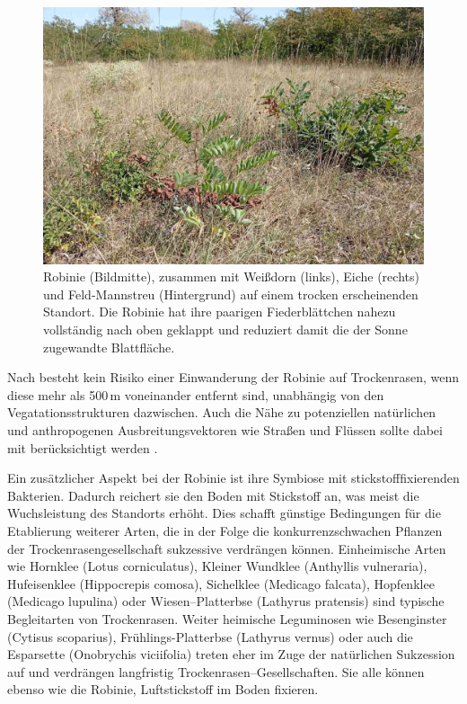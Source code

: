 \documentclass[twocolumn]{scrartcl}
\begin{document}
\begin{figure}[htbp]
  \centering
  \includegraphics[width=.9\linewidth]{./bild/feldmannstreu2}
  \caption{Robinie (Bildmitte), zusammen mit Weißdorn (links), Eiche (rechts) und Feld-Mannstreu (Hintergrund) auf einem trocken erscheinenden Standort. Die Robinie hat ihre paarigen Fiederblättchen nahezu vollständig nach oben geklappt und reduziert damit die der Sonne zugewandte Blattfläche.}
  \label{fig:feldmannstreu}
\end{figure}

Nach \citet[S.~134]{landeck2022robinie} besteht kein Risiko einer
Einwanderung der Robinie auf Trockenrasen, wenn diese mehr als 500\,m
voneinander entfernt sind, unabhängig von den Vegatationsstrukturen
dazwischen. Auch die Nähe zu potenziellen natürlichen und
anthropogenen Ausbreitungsvektoren wie Straßen und Flüssen sollte
dabei mit berücksichtigt werden \citep{skowronek2020robinieNaturschutz}.

Ein zusätzlicher Aspekt bei der Robinie ist ihre Symbiose mit
stickstofffixierenden Bakterien. Dadurch reichert sie den Boden mit Stickstoff
an, was meist die Wuchsleistung des Standorts erhöht. Dies schafft günstige
Bedingungen für die Etablierung weiterer Arten, die in der Folge die
konkurrenzschwachen Pflanzen der Trockenrasengesellschaft sukzessive verdrängen
können. Einheimische Arten wie Hornklee (Lotus corniculatus), Kleiner Wundklee
(Anthyllis vulneraria), Hufeisenklee (Hippocrepis comosa), Sichelklee (Medicago
falcata), Hopfenklee (Medicago lupulina) oder Wiesen--Platterbse (Lathyrus
pratensis) sind typische Begleitarten von Trockenrasen.
Weiter heimische Leguminosen wie Besenginster (Cytisus scoparius),
Frühlings-Platterbse (Lathyrus vernus) oder auch die Esparsette (Onobrychis
viciifolia) treten eher im Zuge der natürlichen Sukzession auf und verdrängen
langfristig Trockenrasen--Gesellschaften. Sie alle können ebenso wie die
Robinie, Luftstickstoff im Boden fixieren.
\end{document}
